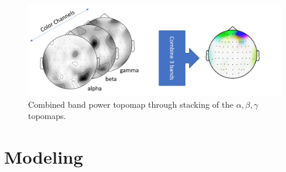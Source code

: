\documentclass{article}
\begin{document}
\begin{figure}[ht]
\vskip 0.2in
\begin{center}
\centerline{\includegraphics[width=\columnwidth]{Images/combine_bands}}
\caption[Spatial-spectral topomap generation process]{Combined band power topomap through stacking of the $\alpha, \beta, \gamma$ topomaps.}
\label{comine_band}
\end{center}
\vskip -0.2in
\end{figure}

\section{Modeling}
\end{document}
